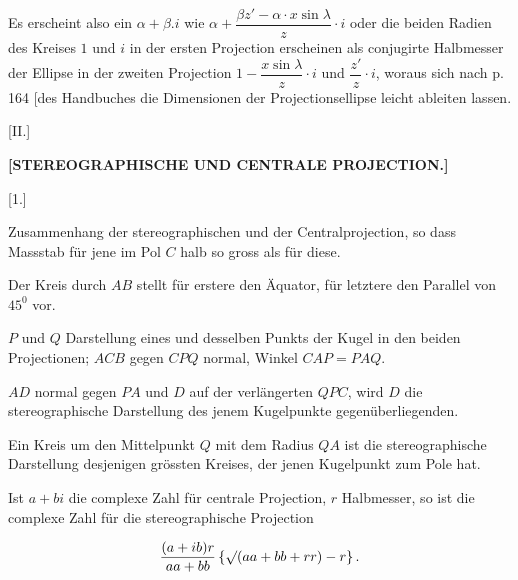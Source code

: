 
Es erscheint also ein $\alpha+\beta.i$ wie $\alpha+\dfrac{\beta z' - \alpha\cdot x\sin\lambda}{z}\cdot i$ oder die beiden Radien des Kreises $1$ und $i$ in der ersten Projection erscheinen als conjugirte Halbmesser der Ellipse in der zweiten Projection $1-\dfrac{x\sin\lambda}{z}\cdot i$ und $\dfrac{z'}{z}\cdot i$, woraus sich nach p.\,164 [des Handbuches die Dimensionen der Projectionsellipse leicht ableiten lassen.



\begin{center}
[II.]
\end{center}

\begin{center}
\bfseries [STEREOGRAPHISCHE UND CENTRALE PROJECTION.]
\end{center}

\begin{center}
[1.]
\end{center}

\begin{center}
Zusammenhang der stereographischen und der Centralprojection, so dass\\
Massstab für jene im Pol $C$ halb so gross als für diese.
\end{center}

Der Kreis durch $AB$ stellt für erstere den Äquator, für letztere den Parallel von $45^0$ vor.

\begin{center}\end{center}
\indent $P$ und $Q$ Darstellung eines und desselben Punkts der Kugel in den beiden Projectionen; $ACB$ gegen $CPQ$ normal, Winkel $CAP = PAQ$.

$AD$ normal gegen $PA$ und $D$ auf der verlängerten $QPC$, wird $D$ die stereographische Darstellung des jenem Kugelpunkte gegenüberliegenden.

Ein Kreis um den Mittelpunkt $Q$ mit dem Radius $QA$ ist die stereographische Darstellung desjenigen grössten Kreises, der jenen Kugelpunkt zum Pole hat.

Ist $a+bi$ die complexe Zahl für centrale Projection, $r$ Halbmesser, so ist die complexe Zahl für die stereographische Projection

\[
\frac{(a+ib)r}{aa+bb}\left\{\mathord{\surd}(aa+bb+rr)-r\right\}.
\]


